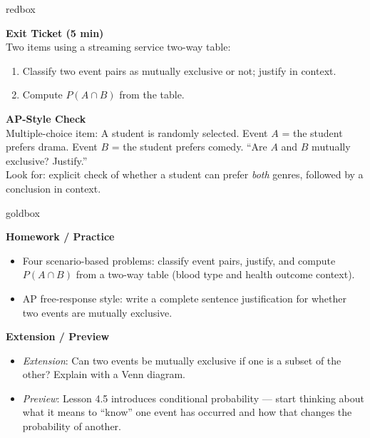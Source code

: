 \documentclass[10pt]{article}
\begin{document}
\begin{skillbox}{redbox}
\begin{minipage}[t]{0.48\linewidth}
    \textbf{Exit Ticket (5 min)}\\
    Two items using a streaming service two-way table:
    \begin{enumerate}
        \item Classify two event pairs as mutually exclusive or not; justify in context.
        \item Compute $P(A \cap B)$ from the table.
    \end{enumerate}
\end{minipage}
\hfill
\begin{minipage}[t]{0.48\linewidth}
    \textbf{AP-Style Check}\\
    Multiple-choice item: A student is randomly selected. Event $A$ = the student
    prefers drama. Event $B$ = the student prefers comedy.
    ``Are $A$ and $B$ mutually exclusive? Justify.''\\[4pt]
    Look for: explicit check of whether a student can prefer \emph{both} genres,
    followed by a conclusion in context.
\end{minipage}
\end{skillbox}

\begin{skillbox}{goldbox}
\begin{minipage}[t]{0.48\linewidth}
    \textbf{Homework / Practice}
    \begin{itemize}
        \item Four scenario-based problems: classify event pairs, justify, and compute
              $P(A \cap B)$ from a two-way table (blood type and health outcome context).
        \item AP free-response style: write a complete sentence justification for
              whether two events are mutually exclusive.
    \end{itemize}
\end{minipage}
\hfill
\begin{minipage}[t]{0.48\linewidth}
    \textbf{Extension / Preview}
    \begin{itemize}
        \item \textit{Extension}: Can two events be mutually exclusive if one is
              a subset of the other? Explain with a Venn diagram.
        \item \textit{Preview}: Lesson 4.5 introduces conditional probability ---
              start thinking about what it means to ``know'' one event has occurred
              and how that changes the probability of another.
    \end{itemize}
\end{minipage}
\end{skillbox}
\end{document}

